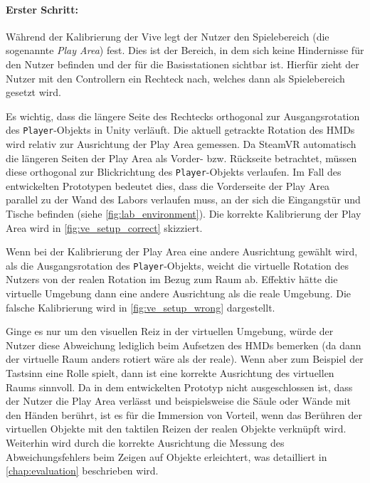 \paragraph{Erster Schritt:}
Während der Kalibrierung der Vive legt der Nutzer den Spielebereich (die sogenannte \emph{Play Area}) fest.
Dies ist der Bereich, in dem sich keine Hindernisse für den Nutzer befinden und der für die Basisstationen sichtbar ist.
Hierfür zieht der Nutzer mit den Controllern ein Rechteck nach, welches dann als Spielebereich gesetzt wird.

Es wichtig, dass die längere Seite des Rechtecks orthogonal zur Ausgangsrotation des \lstinline{Player}-Objekts in Unity verläuft.
Die aktuell getrackte Rotation des HMDs wird relativ zur Ausrichtung der Play Area gemessen.
Da SteamVR automatisch die längeren Seiten der Play Area als Vorder- bzw. Rückseite betrachtet, müssen diese orthogonal zur Blickrichtung des \lstinline{Player}-Objekts verlaufen.
Im Fall des entwickelten Prototypen bedeutet dies, dass die Vorderseite der Play Area parallel zu der Wand des Labors verlaufen muss, an der sich die Eingangstür und Tische befinden (siehe \autoref{fig:lab_environment}).
Die korrekte Kalibrierung der Play Area wird in \autoref{fig:ve_setup_correct} skizziert.

Wenn bei der Kalibrierung der Play Area eine andere Ausrichtung gewählt wird, als die Ausgangsrotation des \lstinline{Player}-Objekts, weicht die virtuelle Rotation des Nutzers von der realen Rotation im Bezug zum Raum ab.
Effektiv hätte die virtuelle Umgebung dann eine andere Ausrichtung als die reale Umgebung.
Die falsche Kalibrierung wird in \autoref{fig:ve_setup_wrong} dargestellt.

Ginge es nur um den visuellen Reiz in der virtuellen Umgebung, würde der Nutzer diese Abweichung lediglich beim Aufsetzen des HMDs bemerken (da dann der virtuelle Raum anders rotiert wäre als der reale).
Wenn aber zum Beispiel der Tastsinn eine Rolle spielt, dann ist eine korrekte Ausrichtung des virtuellen Raums sinnvoll.
Da in dem entwickelten Prototyp nicht ausgeschlossen ist, dass der Nutzer die Play Area verlässt und beispielsweise die Säule oder Wände mit den Händen berührt, ist es für die Immersion von Vorteil, wenn das Berühren der virtuellen Objekte mit den taktilen Reizen der realen Objekte verknüpft wird.
Weiterhin wird durch die korrekte Ausrichtung die Messung des Abweichungsfehlers beim Zeigen auf Objekte erleichtert, was detailliert in \autoref{chap:evaluation} beschrieben wird.

